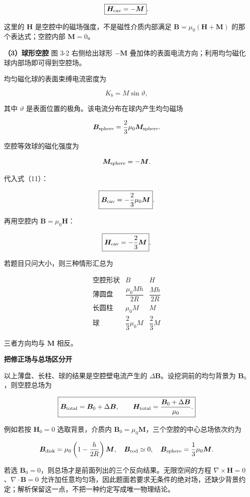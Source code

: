 \documentclass[12pt,a4paper,UTF8]{ctexart}
\begin{document}
\[\boxed{\bm H_{\rm cav}=-\bm M}.\]

这里的 \(\bm H\) 是空腔中的磁场强度，不是磁性介质内部满足
\(\bm B=\mu_0(\bm H+\bm M)\) 的那个表达式；空腔内部 \(\bm M=0\)。

\textbf{（3）球形空腔} 图 3-2 右侧给出球形 \(-\bm M\)
叠加体的表面电流方向；利用均匀磁化球内部场即可得到空腔场。

均匀磁化球的表面束缚电流密度为

\[K_b=M\sin\vartheta,\]

其中 \(\vartheta\) 是表面位置的极角。该电流分布在球内产生均匀磁场

\[\bm B_{\rm sphere}=\frac23\mu_0\bm M_{\rm sphere}.\]

空腔等效球的磁化强度为

\[\bm M_{\rm sphere}=-\bm M.\]

代入式（11）：

\[\boxed{\bm B_{\rm cav}=-\frac23\mu_0\bm M}.\]

再用空腔内 \(\bm B=\mu_0\bm H\)：

\[\boxed{\bm H_{\rm cav}=-\frac23\bm M}.\]

若题目只问大小，则三种情形汇总为

\[\boxed{
\begin{array}{c|cc}
\text{空腔形状}&B&H\\ \hline
\text{薄圆盘}&\dfrac{\mu_0Mh}{2R}&\dfrac{Mh}{2R}\\[6pt]
\text{长圆柱}&\mu_0M&M\\[4pt]
\text{球}&\dfrac23\mu_0M&\dfrac23M
\end{array}}\]

三者方向均与 \(\bm M\) 相反。

\textbf{把修正场与总场区分开}

以上薄盘、长柱、球的结果是空腔壁电流产生的
\(\Delta\bm B\)。设挖洞前的均匀背景为 \(\bm B_0\)，则空腔总场为

\[\boxed{\bm B_{\rm total}=\bm B_0+\Delta\bm B,\qquad
\bm H_{\rm total}=\frac{\bm B_0+\Delta\bm B}{\mu_0}.}\]

例如若按 \(\bm H_0=0\) 选取背景，介质内
\(\bm B_0=\mu_0\bm M\)，三个空腔的中心总场依次约为

\[\bm B_{\rm disk}=\mu_0\left(1-\frac h{2R}\right)\bm M,
\quad\bm B_{\rm rod}\simeq0,
\quad\bm B_{\rm sphere}=\frac13\mu_0\bm M.\]

若选 \(\bm B_0=0\)，则总场才是前面列出的三个反向结果。无限空间的方程
\(\nabla\times\bm H=0\)、\(\nabla\cdot\bm B=0\)
允许加任意均匀场，因此题面若要求无条件的绝对场，还缺少背景约定；解析保留这一点，不把一种约定写成唯一物理结论。
\end{document}
